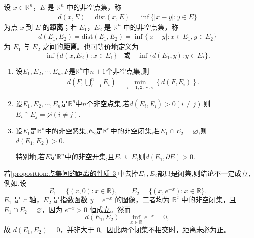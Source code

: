 \documentclass[../../main.tex]{subfiles}%
\begin{document}
\begin{definition}
设 \(x\in\mathbb{R}^n\)，\(E\) 是 \(\mathbb{R}^n\) 中的非空点集，称
\begin{align*}
d(x,E)=\text{dist}(x,E)=\inf\{|x - y|: y\in E\}
\end{align*}
为点 \(x\) 到 \(E\) 的\textbf{距离}；若 \(E_1\)，\(E_2\) 是 \(\mathbb{R}^n\) 中的非空点集，称
\begin{align*}
d(E_1,E_2)=\text{dist}(E_1,E_2)=\inf\{|x - y|: x\in E_1, y\in E_2\}
\end{align*}
为 \(E_1\) 与 \(E_2\) 之间的\textbf{距离}。也可等价地定义为
\[
\inf\{d(x,E_2): x\in E_1\} \quad \text{或} \quad \inf\{d(E_1,y): y\in E_2\}.
\] 
\end{definition}

\begin{proposition}[点集间的距离的性质]\label{proposition:点集间的距离的性质}
\begin{enumerate}[(1)]
\item\label{proposition:点集间的距离的性质-1} 设$E_1,E_2,\cdots,E_n,F$是$\mathbb{R}^n$中$n+1$个非空点集,则
\begin{align*}
d\left( F,\bigcup_{i=1}^n{E_i} \right) =\underset{i=1,2,\cdots ,n}{\min}\left\{ d\left( F,E_i \right) \right\}.
\end{align*}

\item\label{proposition:点集间的距离的性质-2} 设$E_1,E_2,\cdots,E_n$是$\mathbb{R}^n$中$n$个非空点集,若$d(E_i,E_j)>0(i\ne j)$,则$E_i\cap E_j=\varnothing (i\ne j)$.

\item\label{proposition:点集间的距离的性质-3} 设$E_1$是$\mathbb{R}^n$中的非空紧集,$E_2$是$\mathbb{R}^n$中的非空闭集,若$E_1\cap E_2=\varnothing $,则$d(E_1,E_2)>0$.

特别地,若$E$是$\mathbb{R}^n$中的非空开集,且$E_1\subseteq E$,则$d(E_1,\partial E)>0.$
\end{enumerate}
\end{proposition}
\begin{remark}
若\ref{proposition:点集间的距离的性质-3}中去掉$E_1,E_2$都只是闭集,则结论不一定成立,例如,设
\[
E_1=\{(x,0): x\in\mathbb R\},\qquad E_2=\{(x,e^{-x}): x\in\mathbb R\}.
\]
$E_1$ 是 $x$ 轴，$E_2$ 是指数函数 $y=e^{-x}$ 的图像，二者均为 $\mathbb{R}^2$ 中的非空闭集，且 $E_1\cap E_2=\varnothing$，因为 $e^{-x}>0$ 恒成立。然而
\[
d(E_1,E_2)=\inf_{x\in\mathbb R} e^{-x}=0,
\]
故 $d(E_1,E_2)=0$，并非大于 $0$。因此两个闭集不相交时，距离未必为正。
\end{remark}
\end{document}
